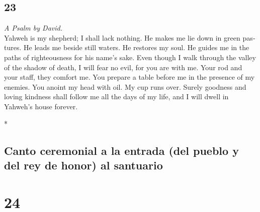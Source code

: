 \begin{paracol}{2}
\switchcolumn
\begin{otherlanguage}{english}

\hypertarget{section-45}{%
\section{23}\label{section-45}}

\emph{A Psalm by David.}\\
 Yahweh is my shepherd; I shall lack nothing.
 He makes me lie down in green pastures. He leads me
beside still waters.  He restores my soul. He guides me in
the paths of righteousness for his name's sake.  Even
though I walk through the valley of the shadow of death, I will fear no
evil, for you are with me. Your rod and your staff, they comfort me.
 You prepare a table before me in the presence of my
enemies. You anoint my head with oil. My cup runs over. 
Surely goodness and loving kindness shall follow me all the days of my
life, and I will dwell in Yahweh's house forever.

\end{otherlanguage}

\switchcolumn[0]*

\hypertarget{canto-ceremonial-a-la-entrada-del-pueblo-y-del-rey-de-honor-al-santuario}{%
\subsection{Canto ceremonial a la entrada (del pueblo y del rey de
honor) al
santuario}\label{canto-ceremonial-a-la-entrada-del-pueblo-y-del-rey-de-honor-al-santuario}}

\hypertarget{section-46}{%
\section{24}\label{section-46}}


\end{paracol}
